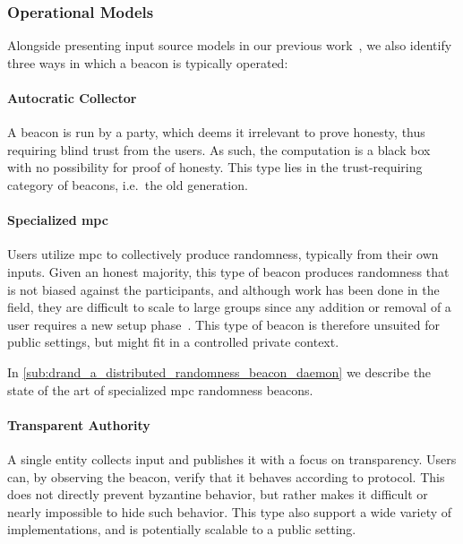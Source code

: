 \subsubsection{Operational Models}
Alongside presenting input source models in our previous work~\cite{worldsbestpaper}, we also identify three ways in which a beacon is typically operated:

\paragraph{Autocratic Collector}
A beacon is run by a party, which deems it irrelevant to prove honesty, thus requiring blind trust from the users.
As such, the computation is a black box with no possibility for proof of honesty.
This type lies in the trust-requiring category of beacons, i.e.\ the old generation.

\paragraph{Specialized \acrshort{mpc}}
Users utilize \acrfull{mpc} to collectively produce randomness, typically from their own inputs.
Given an honest majority, this type of beacon produces randomness that is not biased against the participants, and although work has been done in the field, they are difficult to scale to large groups since any addition or removal of a user requires a new setup phase~\cite{cascudo2017scrape, syta2017scalable}.
This type of beacon is therefore unsuited for public settings, but might fit in a controlled private context.

In \vref{sub:drand_a_distributed_randomness_beacon_daemon} we describe the state of the art of specialized \gls{mpc} randomness beacons.

\paragraph{Transparent Authority}
A single entity collects input and publishes it with a focus on transparency.
Users can, by observing the beacon, verify that it behaves according to protocol.
This does not directly prevent byzantine behavior, but rather makes it difficult or nearly impossible to hide such behavior.
This type also support a wide variety of implementations, and is potentially scalable to a public setting.
